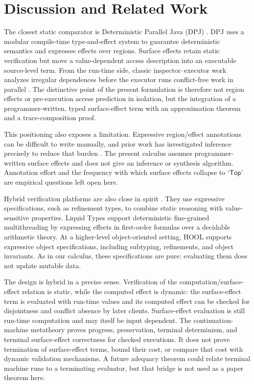 \documentclass[10pt,a4paper]{article}
\newcommand{\Top}{\mathsf{Top}}
\begin{document}
\section{Discussion and Related Work}
\label{sec:related}

The closest static comparator is Deterministic Parallel Java (DPJ)
\citep{bocchino2009}. DPJ uses a modular compile-time type-and-effect system to
guarantee deterministic semantics and expresses effects over regions. Surface
effects retain static verification but move a value-dependent access description
into an executable source-level term. From the run-time side, classic
inspector--executor work analyzes irregular dependences before the executor
runs conflict-free work in parallel \citep{arenaz2004}. The distinctive point
of the present formulation is therefore not region effects or pre-execution
access prediction in isolation, but the integration of a programmer-written,
typed surface-effect term with an approximation theorem and a trace-composition
proof.

This positioning also exposes a limitation. Expressive region/effect
annotations can be difficult to write manually, and prior work has investigated
inference precisely to reduce that burden \citep{tzannes2019}. The present
calculus assumes programmer-written surface effects and does not give
an inference or synthesis algorithm. Annotation effort and the frequency with
which surface effects collapse to `$\Top$' are empirical questions left open here.

Hybrid verification platforms are also close in spirit
\citep{kawaguchi2012,flanagan2006}.  They use expressive specifications, such
as refinement types, to combine static reasoning with value-sensitive
properties.  Liquid Types support deterministic fine-grained multithreading by
expressing effects in first-order formulas over a decidable arithmetic theory.
At a higher-level object-oriented setting, HOOL supports expressive object
specifications, including subtyping, refinements, and object invariants.  As in
our calculus, these specifications are pure: evaluating them does not update
mutable data.

The design is hybrid in a precise sense. Verification of the
computation/surface-effect relation is static, while the computed effect is dynamic:
the surface-effect term is evaluated with run-time values and its computed effect can
be checked for disjointness and conflict absence by later clients. Surface-effect
evaluation is still run-time computation and may itself be input dependent.
The continuation-machine metatheory proves progress, preservation, terminal
determinism, and terminal surface-effect correctness for checked executions.
It does not prove termination of surface-effect terms, bound their cost, or compare
that cost with dynamic validation mechanisms. A future adequacy theorem could
relate terminal machine runs to a terminating evaluator, but that bridge is not
used as a paper theorem here.
\end{document}
